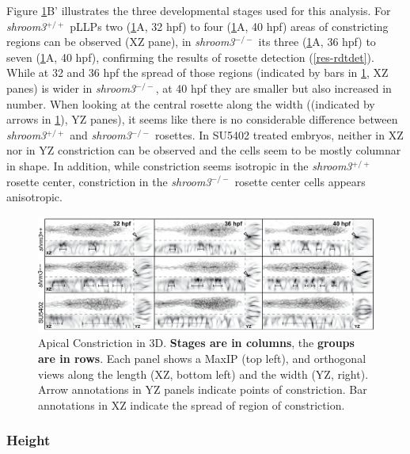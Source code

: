\documentclass[11pt,singlespacinge,twoside]{reedthesis} %
\theoremstyle{definition}
\theoremstyle{definition}
\theoremstyle{definition}
\theoremstyle{remark}
\begin{document}
Figure \ref{fig:acshape}B' illustrates the three developmental stages used for this analysis. For \emph{shroom3}\(^{+/+}\) pLLPs two (\ref{fig:acshape}A, 32 hpf) to four (\ref{fig:acshape}A, 40 hpf) areas of constricting regions can be observed (XZ pane), in \emph{shroom3}\(^{-/-}\) its three (\ref{fig:acshape}A, 36 hpf) to seven (\ref{fig:acshape}A, 40 hpf), confirming the results of rosette detection (\ref{res-rdtdet}). While at 32 and 36 hpf the spread of those regions (indicated by bars in \ref{fig:acshape}, XZ panes) is wider in \emph{shroom3}\(^{-/-}\), at 40 hpf they are smaller but also increased in number. When looking at the central rosette along the width ((indicated by arrows in \ref{fig:acshape}), YZ panes), it seems like there is no considerable difference between \emph{shroom3}\(^{+/+}\) and \emph{shroom3}\(^{-/-}\) rosettes. In SU5402 treated embryos, neither in XZ nor in YZ constriction can be observed and the cells seem to be mostly columnar in shape. In addition, while constriction seems isotropic in the \emph{shroom3}\(^{+/+}\) rosette center, constriction in the \emph{shroom3}\(^{-/-}\) rosette center cells appears anisotropic.


\begin{figure}[H]

{\centering \includegraphics[width=0.95\linewidth]{figures/results/04_constriction/Figure_5-1} 

}

\caption[Apical Constriction in 3D]{Apical Constriction in 3D. \textbf{Stages are in columns}, the \textbf{groups are in rows}. Each panel shows a MaxIP (top left), and orthogonal views along the length (XZ, bottom left) and the width (YZ, right). Arrow annotations in YZ panels indicate points of constriction. Bar annotations in XZ indicate the spread of region of constriction.}\label{fig:acshape}
\end{figure}
\hypertarget{height}{%
\subsubsection{Height}\label{height}}
\end{document}
